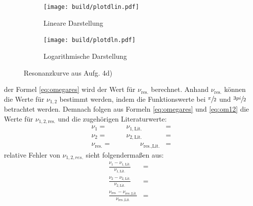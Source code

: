   \begin{figure}[H]
    \begin{subfigure}{0.495\linewidth}
     \texttt{[image: build/plotdlin.pdf]}
     \centering
     \caption{Lineare Darstellung}
     \label{fig:4dlin}
    \end{subfigure}
    \begin{subfigure}{0.495\linewidth}
     \texttt{[image: build/plotdln.pdf]}
     \centering
     \caption{Logarithmische Darstellung}
     \label{fig:4dln}
    \end{subfigure}
    \caption{Resonanzkurve aus Aufg. 4d)}
  \end{figure} 

  \justifying der Formel \eqref{eq:omegares} wird der Wert für $\nu_{\text{res.}}$ berechnet. Anhand $\nu_{\text{res.}}$
  können die Werte für $\nu_{1,2}$ bestimmt werden, indem die Funktionswerte bei $\sfrac{\pi}{2}$ und 
  $\sfrac{3 \\pi}{2}$ betrachtet werden. Demnach folgen aus Formeln \eqref{eq:omegares} und \eqref{eq:om12} die Werte für $\nu_{1,2,\text{res.}}$ und die
  zugehörigen Literaturwerte:
  \begin{subequations}
  \begin{align}
    &\nu_1 = \text{} \qquad &\nu_{1,\text{Lit.}} &= \text{}\\
    &\nu_2 = \text{} \qquad &\nu_{2,\text{Lit.}} &= \text{}\\
    &\nu_{\text{res.}} = \text{} &\qquad \nu_{\text{res.,Lit.}} &= \text{}
  \end{align}
  \end{subequations}
  \justifying relative Fehler von $\nu_{1,2,res.}$ sieht folgendermaßen aus:
  \begin{subequations}
  \begin{align}
    \frac{\nu_1 - \nu_{1,\text{Lit.}}}{\nu_{1,\text{Lit.}}} &= \text{}\\
    \frac{\nu_2 - \nu_{2,\text{Lit.}}}{\nu_{2,\text{Lit.}}} &= \text{}\\
    \frac{\nu_{\text{res.}} - \nu_{\text{res.,Lit.}}}{\nu_{\text{res.,Lit.}}} &= \text{}
  \end{align} 
  \end{subequations}
  \newpage



